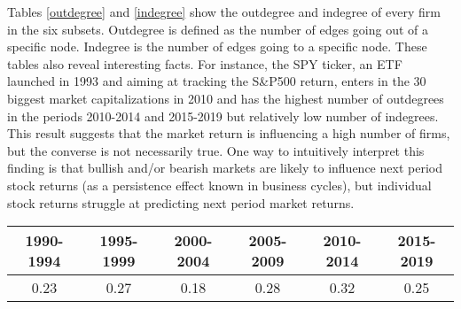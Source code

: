 Tables \ref{outdegree} and \ref{indegree} show the outdegree and indegree of every firm in the six subsets. Outdegree is defined as the number of edges going out of a specific node. Indegree is the number of edges going to a specific node.
These tables also reveal interesting facts. For instance, the SPY ticker, an ETF launched in 1993 and aiming at tracking the S\&P500 return, enters in the 30 biggest market capitalizations in 2010 and has the highest number of outdegrees in the periods 2010-2014 and 2015-2019 but relatively low number of indegrees. 
This result suggests that the market return is influencing a high number of firms, but the converse is not necessarily true. One way to intuitively interpret this finding is that bullish and/or bearish markets are likely to influence next period stock returns (as a persistence effect known in business cycles), but individual stock returns struggle at predicting next period market returns. 


\begin{table}[]
\begin{tabular}{cccccc}
\hline
\multicolumn{1}{|c|}{1990-1994} &
  \multicolumn{1}{c|}{1995-1999} &
  \multicolumn{1}{c|}{2000-2004} &
  \multicolumn{1}{c|}{2005-2009} &
  \multicolumn{1}{c|}{2010-2014} &
  \multicolumn{1}{c|}{2015-2019} \\ \hline
\multicolumn{1}{|c|}{0.23} &
  \multicolumn{1}{c|}{0.27} &
  \multicolumn{1}{c|}{0.18} &
  \multicolumn{1}{c|}{0.28} &
  \multicolumn{1}{c|}{0.32} &
  \multicolumn{1}{c|}{0.25} \\ \hline

\end{tabular}
\label{GrangerCausality}
\end{table}

    

